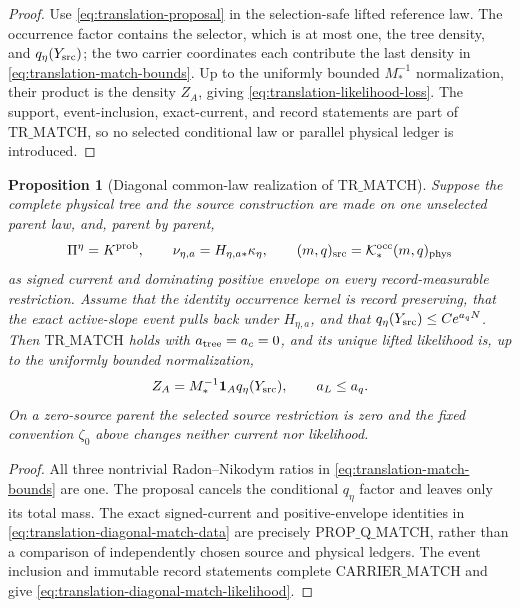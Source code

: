 \documentclass[11pt]{article}
\newtheorem{proposition}[theorem]{Proposition}
\newcommand{\one}{\mathbf 1}
\begin{document}
\begin{proof}
Use \eqref{eq:translation-proposal} in the selection-safe lifted reference
law.  The occurrence factor contains the selector, which is at most one,
the tree density, and $q_\eta(Y_{\rm src})$; the two carrier coordinates
each contribute the last density in
\eqref{eq:translation-match-bounds}.  Up to the uniformly bounded
$M_*^{-1}$ normalization, their product is the density $Z_A$, giving
\eqref{eq:translation-likelihood-loss}.  The support,
event-inclusion, exact-current, and record statements are part of
$\mathrm{TR\_MATCH}$, so no selected conditional law or parallel physical
ledger is introduced.
\end{proof}

\begin{proposition}[Diagonal common-law realization of
$\mathrm{TR\_MATCH}$]
\label{prop:translation-diagonal-match}
Suppose the complete physical tree and the source construction are made on
one unselected parent law, and, parent by parent,
\begin{equation}
\label{eq:translation-diagonal-match-data}
 \Pi^\eta=K^{\rm prob},\qquad
 \nu_{\eta,a}=H_{\eta,a*}\kappa_\eta,
 \qquad
 (m,q)_{\rm src}=\mathcal K^{\rm occ}_*(m,q)_{\rm phys}
\end{equation}
as signed current and dominating positive envelope on every
record-measurable restriction.  Assume that the identity occurrence kernel
is record preserving, that the exact active-slope event pulls back under
$H_{\eta,a}$, and that
$q_\eta(Y_{\rm src})\le Ce^{a_qN}$.  Then
$\mathrm{TR\_MATCH}$ holds with $a_{\rm tree}=a_c=0$, and its unique lifted
likelihood is, up to the uniformly bounded normalization,
\begin{equation}
\label{eq:translation-diagonal-match-likelihood}
 Z_A=M_*^{-1}\one_A q_\eta(Y_{\rm src}),
 \qquad a_L\le a_q.
\end{equation}
On a zero-source parent the selected source restriction is zero and the
fixed convention $\zeta_0$ above changes neither current nor likelihood.
\end{proposition}

\begin{proof}
All three nontrivial Radon--Nikodym ratios in
\eqref{eq:translation-match-bounds} are one.  The proposal cancels the
conditional $q_\eta$ factor and leaves only its total mass.  The exact
signed-current and positive-envelope identities in
\eqref{eq:translation-diagonal-match-data} are precisely
$\mathrm{PROP\_Q\_MATCH}$, rather than a comparison of independently
chosen source and physical ledgers.  The event inclusion and immutable
record statements complete $\mathrm{CARRIER\_MATCH}$ and give
\eqref{eq:translation-diagonal-match-likelihood}.
\end{proof}
\end{document}
